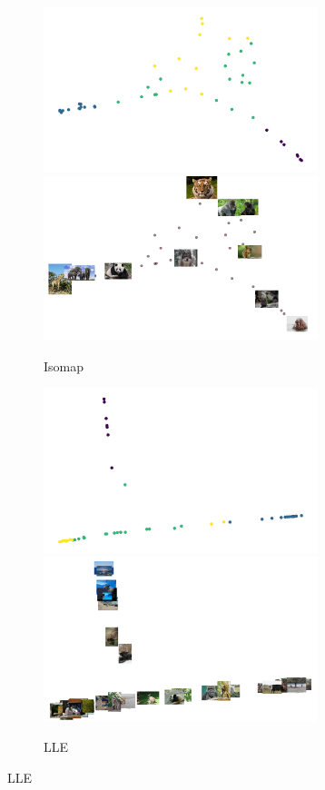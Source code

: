 \begin{figure}[H]
    \centering
    \begin{subfigure}{17cm}
        \centering
        \includegraphics[width=8cm]{Graphics/SOM_isomap.png}
        \includegraphics[width=8cm]{Graphics/Isomap.png}
        \caption{Isomap}
    \end{subfigure}
    \begin{subfigure}{17cm}
        \centering
        \includegraphics[width=8cm]{Graphics/SOM_LLE.png}
        \includegraphics[width=8cm]{Graphics/LLE.png}
        \caption{LLE}
    \end{subfigure}

\end{figure}
